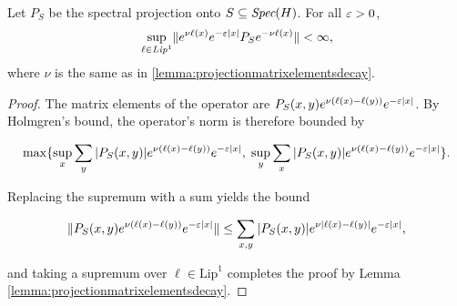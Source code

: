 \documentclass[12pt, letterpaper]{article}
\begin{document}
\begin{lemma}
Let $P_S$ be the spectral projection onto $S \subseteq \emph{Spec}(H)$. For all $\varepsilon>0$,
\[\sup_{\ell \in \emph{Lip}^1} \lVert e^{\nu \ell(x)} e^{-\varepsilon|x|} P_S e^{-\nu\ell(x)} \rVert < \infty,\]
where $\nu$ is the same as in \ref{lemma:projectionmatrixelementsdecay}.
\label{lemma:projectionoperatordecay}
\end{lemma}
\begin{proof}
The matrix elements of the operator are $P_S(x,y) e^{\nu (\ell(x)-\ell(y))}e^{-\varepsilon|x|}$. By Holmgren's bound, the operator's norm is therefore bounded by 

\[\max\{\sup_x \sum_y |P_S(x,y)| e^{\nu (\ell(x)-\ell(y))}e^{-\varepsilon|x|}, \; \sup_y \sum_x|P_S(x,y)| e^{\nu (\ell(x)-\ell(y))}e^{-\varepsilon|x|}\}.\]

Replacing the supremum with a sum yields the bound

\[\lVert P_S(x,y) e^{\nu (\ell(x)-\ell(y))}e^{-\varepsilon|x|} \rVert \leq \sum_{x,y} |P_S(x,y)| e^{\nu |\ell(x)-\ell(y)|}e^{-\varepsilon|x|},\]

and taking a supremum over $\ell \in \text{Lip}^1$ completes the proof by Lemma \ref{lemma:projectionmatrixelementsdecay}.
\end{proof}
\end{document}
